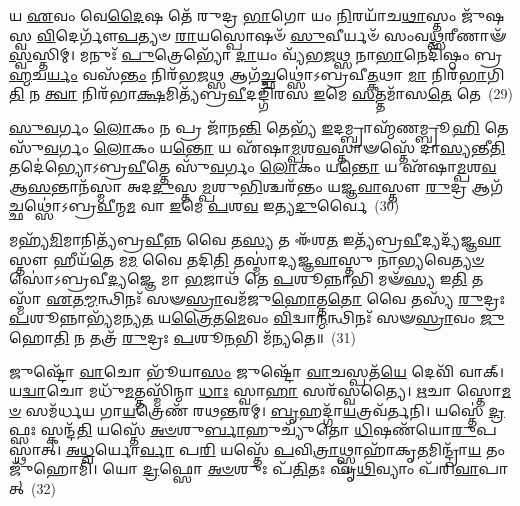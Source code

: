𑌯 \ul{𑌏}\-𑌵𑌂 𑌵𑍇\-\ul{𑌦𑍈}\-𑌷 𑌤𑍇᳴ 𑌰𑍁𑌦𑍍𑌰 \ul{𑌭𑌾}\-𑌗𑍋 𑌯𑌂 \ul{𑌨𑌿}\-𑌰𑌯𑌾᳴𑌚\-\ul{𑌥𑌾}\-𑌸𑍍𑌤𑌂 𑌜𑍁᳴𑌷𑌸𑍍𑌵 \ul{𑌵𑌿}\-𑌦𑍇𑌰𑍍𑌗𑍗᳴\-\ul{𑌪}\-𑌤𑍍𑌯𑍞 \ul{𑌰𑌾}\-𑌯𑌸𑍍𑌪𑍋𑌷𑍞᳴ \ul{𑌸𑍁}\-𑌵𑍀𑌰𑍍𑌯𑍞᳴ 𑌸𑌂𑌵\-\ul{𑌥𑍍𑌸}\-𑌰𑍀𑌣𑌾𑍟᳴ \ul{𑌸𑍍𑌵}\-𑌸𑍍𑌤𑌿𑌮𑍍। 𑌮𑌨𑍁𑌃᳴ \ul{𑌪𑍁}\-𑌤𑍍𑌰𑍇𑌭𑍍𑌯𑍋᳴ \ul{𑌦𑌾}\-𑌯𑌂 𑌵𑍍𑌯᳴𑌭\-\ul{𑌜}\-𑌥𑍍𑌸 𑌨𑌾\-\ul{𑌭𑌾}\-𑌨𑍇𑌦𑌿᳴𑌷𑍍𑌠𑌂 𑌬𑍍𑌰\-\ul{𑌹𑍍𑌮}\-𑌚\-\ul{𑌰𑍍𑌯𑌂} 𑌵𑌸᳴\-\ul{𑌨𑍍𑌤𑌂} 𑌨𑌿𑌰᳴𑌭\-\ul{𑌜}\-𑌥𑍍𑌸 𑌆𑌗᳴\-\ul{𑌚𑍍𑌛}\-𑌥𑍍𑌸𑍋॑\-𑌽𑌬𑍍𑌰𑌵𑍀\-\ul{𑌤𑍍𑌕}\-𑌥𑌾 \ul{𑌮𑌾} 𑌨𑌿𑌰᳴\-\ul{𑌭𑌾}\-𑌗𑌿\-\ul{𑌤𑌿} 𑌨 \ul{𑌤𑍍𑌵𑌾} 𑌨𑌿𑌰᳴𑌭𑌾\-\ul{𑌕𑍍𑌷}\-𑌮𑌿𑌤𑍍𑌯᳴𑌬𑍍𑌰\-\ul{𑌵𑍀}\-𑌦𑌙𑍍𑌗𑌿᳴𑌰𑌸 \ul{𑌇}\-𑌮𑍇 \ul{𑌸}\-𑌤𑍍𑌤𑌮𑌾᳴𑌸\-\ul{𑌤𑍇} 𑌤𑍇~(29)

\-\ul{𑌸𑍁}\-\-\ul{𑌵}\-𑌰𑍍𑌗𑌂 \ul{𑌲𑍋}\-𑌕𑌂 𑌨 𑌪𑍍𑌰 𑌜𑌾᳴𑌨\-\ul{𑌨𑍍𑌤𑌿} 𑌤𑍇𑌭𑍍𑌯᳴ \ul{𑌇}\-𑌦𑌮𑍍𑌬𑍍𑌰𑌾𑌹𑍍𑌮᳴𑌣𑌮𑍍𑌬𑍍𑌰𑍂\-\ul{𑌹𑌿} 𑌤𑍇 𑌸𑍁᳴\-\ul{𑌵}\-𑌰𑍍𑌗𑌂 \ul{𑌲𑍋}\-𑌕𑌂 𑌯\-\ul{𑌨𑍍𑌤𑍋} 𑌯 𑌏᳴𑌷𑌾\-\ul{𑌮𑍍𑌪}\-𑌶\-\ul{𑌵}\-𑌸𑍍𑌤𑌾𑍟𑌸𑍍𑌤𑍇᳴ 𑌦𑌾\-\ul{𑌸𑍍𑌯}\-𑌨𑍍𑌤𑍀\-\ul{𑌤𑌿} 𑌤𑌦𑍇॑𑌭𑍍𑌯𑍋\-𑌽𑌬𑍍𑌰\-\ul{𑌵𑍀}\-𑌤𑍍𑌤𑍇 𑌸𑍁᳴\-\ul{𑌵}\-𑌰𑍍𑌗𑌂 \ul{𑌲𑍋}\-𑌕𑌂 𑌯\-\ul{𑌨𑍍𑌤𑍋} 𑌯 𑌏᳴𑌷𑌾\-\ul{𑌮𑍍𑌪}\-𑌶\-\ul{𑌵} 𑌆\-\ul{𑌸}\-𑌨𑍍𑌤𑌾𑌨᳴𑌸𑍍𑌮𑌾 𑌅𑌦\-\ul{𑌦𑍁}\-𑌸𑍍𑌤\-\ul{𑌮𑍍𑌪}\-𑌶𑍁\-\ul{𑌭𑌿}\-𑌶𑍍𑌚𑌰᳴𑌨𑍍𑌤𑌂 𑌯𑌜𑍍𑌞\-\ul{𑌵𑌾}\-𑌸𑍍𑌤𑍗 \ul{𑌰𑍁}\-𑌦𑍍𑌰 𑌆𑌗᳴\-\ul{𑌚𑍍𑌛}\-𑌥𑍍𑌸𑍋॑\-𑌽𑌬𑍍𑌰\-\ul{𑌵𑍀}\-𑌨𑍍𑌮\-\ul{𑌮} 𑌵𑌾 \ul{𑌇}\-𑌮𑍇 \ul{𑌪}\-𑌶\-\ul{𑌵} 𑌇𑌤𑍍𑌯\-\ul{𑌦𑍁}\-𑌰𑍍𑌵𑍈~(30)

𑌮𑌹𑍍𑌯᳴\-\ul{𑌮𑌿}\-𑌮𑌾𑌨𑌿𑌤𑍍𑌯᳴𑌬𑍍𑌰\-\ul{𑌵𑍀}\-𑌨𑍍𑌨 𑌵𑍈 𑌤\-\ul{𑌸𑍍𑌯} 𑌤 𑌈᳴𑌶\-\ul{𑌤} 𑌇𑌤𑍍𑌯᳴𑌬𑍍𑌰\-\ul{𑌵𑍀}\-𑌦𑍍𑌯𑌦𑍍𑌯᳴𑌜𑍍𑌞\-\ul{𑌵𑌾}\-𑌸𑍍𑌤𑍗 𑌹𑍀𑌯᳴\-\ul{𑌤𑍇} 𑌮\-\ul{𑌮} 𑌵𑍈 𑌤𑌦𑌿\-\ul{𑌤𑌿} 𑌤𑌸𑍍𑌮𑌾॑𑌦𑍍𑌯𑌜𑍍𑌞\-\ul{𑌵𑌾}\-𑌸𑍍𑌤𑍁 𑌨𑌾\-\ul{𑌭𑍍𑌯}\-𑌵𑍇\-\ul{𑌤𑍍𑌯}\-\-\ul{𑍞} 𑌸𑍋॑\-𑌽𑌬𑍍𑌰𑌵𑍀\-\ul{𑌦𑍍𑌯}\-𑌜𑍍𑌞𑍇 𑌮𑌾 \ul{𑌭}\-𑌜𑌾𑌥᳴ 𑌤𑍇 \ul{𑌪}\-𑌶𑍂𑌨𑍍𑌨𑌾𑌭𑌿 𑌮𑍟᳴\-\ul{𑌸𑍍𑌯} 𑌇\-\ul{𑌤𑌿} 𑌤𑌸𑍍𑌮𑌾᳴ \ul{𑌏}\-𑌤\-\ul{𑌮𑍍𑌮}\-𑌨𑍍𑌥𑌿𑌨𑌃᳴ 𑌸𑍟\-\ul{𑌸𑍍𑌰𑌾}\-𑌵𑌮᳴𑌜𑍁\-\ul{𑌹𑍋}\-𑌤𑍍𑌤\-\ul{𑌤𑍋} 𑌵𑍈 𑌤𑌸𑍍𑌯᳴ \ul{𑌰𑍁}\-𑌦𑍍𑌰𑌃 \ul{𑌪}\-𑌶𑍂𑌨𑍍𑌨𑌾𑌭𑍍𑌯᳴𑌮𑌨𑍍𑌯\-\ul{𑌤} 𑌯\-\ul{𑌤𑍍𑌰𑍈}\-𑌤\-\ul{𑌮𑍇}\-𑌵𑌂 \ul{𑌵𑌿}\-𑌦𑍍𑌵𑌾\-\ul{𑌨𑍍𑌮}\-𑌨𑍍𑌥𑌿𑌨𑌃᳴ 𑌸𑍟\-\ul{𑌸𑍍𑌰𑌾}\-𑌵𑌂 \ul{𑌜𑍁}\-𑌹𑍋\-\ul{𑌤𑌿} 𑌨 𑌤𑌤𑍍𑌰᳴ \ul{𑌰𑍁}\-𑌦𑍍𑌰𑌃 \ul{𑌪}\-𑌶𑍂\-\ul{𑌨}\-𑌭𑌿 𑌮᳴𑌨𑍍𑌯𑌤𑍇॥~(31)

{\anuvakamend[{\-\ul{𑌦}\-\-\ul{𑌧𑌾}\-\-\ul{𑌤𑍍𑌵𑌾}\-𑌯𑌤᳴𑌨𑌵\-\ul{𑌤𑍀}\-𑌰𑍍𑌯𑌾 𑌉᳴𑌪𑌜𑍀\-\ul{𑌵}\-𑌨𑍀𑌯𑍋᳴ 𑌭𑌵\-\ul{𑌤𑌿} 𑌤𑍇\-𑌽\-\ul{𑌦𑍁}\-𑌰𑍍𑌵𑍈 𑌯\-\ul{𑌤𑍍𑌰𑍈}\-𑌤𑌮𑍇𑌕𑌾᳴\-𑌦𑌶 𑌚}]}%

𑌜𑍁𑌷𑍍𑌟𑍋᳴ \ul{𑌵𑌾}\-𑌚𑍋 𑌭𑍂᳴𑌯𑌾\-\ul{𑌸𑌂} 𑌜𑍁𑌷𑍍𑌟𑍋᳴ \ul{𑌵𑌾}\-𑌚𑌸𑍍𑌪𑌤᳴\-\ul{𑌯𑍇} 𑌦𑍇𑌵𑌿᳴ 𑌵𑌾𑌕𑍍। 𑌯\-\ul{𑌦𑍍𑌵𑌾}\-𑌚𑍋 𑌮𑌧𑍁᳴\-\ul{𑌮}\-𑌤𑍍𑌤𑌸𑍍𑌮𑌿᳴𑌨𑍍𑌮𑌾 \ul{𑌧𑌾𑌃} 𑌸𑍍𑌵𑌾\-\ul{𑌹𑌾} 𑌸𑌰᳴𑌸𑍍𑌵𑌤𑍍𑌯𑍈। \ul{𑌋}\-𑌚𑌾 𑌸𑍍𑌤𑍋\-\ul{𑌮}\-\-\ul{𑍞} 𑌸𑌮᳴𑌰𑍍𑌧𑌯 𑌗𑌾\-\ul{𑌯}\-𑌤𑍍𑌰𑍇𑌣᳴ 𑌰𑌥\-\ul{𑌨𑍍𑌤}\-𑌰𑌮𑍍। \ul{𑌬𑍃}\-𑌹𑌦𑍍𑌗𑌾᳴\-\ul{𑌯}\-𑌤𑍍𑌰𑌵᳴𑌰𑍍𑌤𑌨𑌿। 𑌯𑌸𑍍𑌤𑍇॑ \ul{𑌦𑍍𑌰}\-𑌫𑍍𑌸𑌃 𑌸𑍍𑌕𑌨𑍍𑌦᳴\-\ul{𑌤𑌿} 𑌯𑌸𑍍𑌤𑍇᳴ \ul{𑌅}\-\-\ul{𑍞}\-𑌶𑍁\-\ul{𑌰𑍍𑌬𑌾}\-𑌹𑍁𑌚𑍍𑌯𑍁᳴𑌤𑍋 \ul{𑌧𑌿}\-𑌷𑌣᳴𑌯𑍋\-\ul{𑌰𑍁}\-𑌪𑌸𑍍𑌥𑌾॑𑌤𑍍। \ul{𑌅}\-\-\ul{𑌧𑍍𑌵}\-𑌰𑍍𑌯𑍋\-\ul{𑌰𑍍𑌵𑌾} 𑌪\-\ul{𑌰𑌿} 𑌯𑌸𑍍𑌤𑍇᳴ \ul{𑌪}\-𑌵𑌿\-\ul{𑌤𑍍𑌰𑌾}\-𑌥𑍍𑌸𑍍𑌵𑌾𑌹𑌾᳴𑌕𑍃\-\ul{𑌤}\-𑌮𑌿𑌨𑍍𑌦𑍍𑌰𑌾᳴\-\ul{𑌯} 𑌤𑌂 𑌜𑍁᳴𑌹𑍋𑌮𑌿। 𑌯𑍋 \ul{𑌦𑍍𑌰}\-𑌫𑍍𑌸𑍋 \ul{𑌅}\-\-\ul{𑍞}\-𑌶𑍁𑌃 𑌪᳴\-\ul{𑌤𑌿}\-𑌤𑌃 𑌪𑍃᳴\-\ul{𑌥𑌿}\-𑌵𑍍𑌯𑌾𑌂 𑌪᳴𑌰𑌿\-\ul{𑌵𑌾}\-𑌪𑌾𑌤𑍍~(32)


